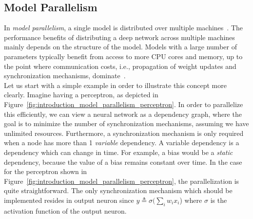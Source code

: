 \subsection{Model Parallelism}
\label{sec:intro_model_parallelism}

In \emph{model parallelism}, a single model is distributed over multiple machines~\cite{dean2012large}. The performance benefits of distributing a deep network across multiple machines mainly depends on the structure of the model. Models with a large number of parameters typically benefit from access to more CPU cores and memory, up to the point where communication costs, i.e., propagation of weight updates and synchronization mechanisms, dominate~\cite{dean2012large}.\\

Let us start with a simple example in order to illustrate this concept more clearly. Imagine having a perceptron, as depicted in Figure~\ref{fig:introduction_model_parallelism_perceptron}. In order to parallelize this efficiently, we can view a neural network as a dependency graph, where the goal is to minimize the number of synchronization mechanisms, assuming we have unlimited resources. Furthermore, a synchronization mechanism is only required when a node has more than 1 \emph{variable} dependency. A variable dependency is a dependency which can change in time. For example, a bias would be a \emph{static} dependency, because the value of a bias remains constant over time. In the case for the perceptron shown in Figure~\ref{fig:introduction_model_parallelism_perceptron}, the parallelization is quite straightforward. The only synchronization mechanism which should be implemented resides in output neuron since $y \triangleq \sigma(\sum_i w_ix_i$) where $\sigma$ is the activation function of the output neuron.

